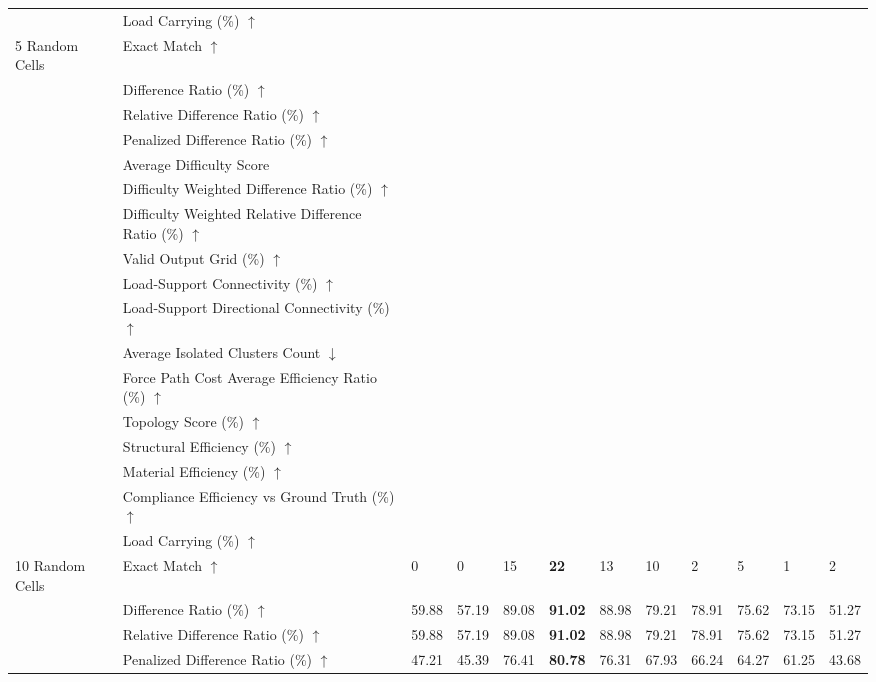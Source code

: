 \begin{table}[!h]
{\begin{tabular}{llllllllllll}
 & Load Carrying (\%) $\uparrow$ &  &  &  &  &  &  &  &  &  &  \\
5 Random Cells & Exact Match $\uparrow$ &  &  &  &  &  &  &  &  &  &  \\
 & Difference Ratio (\%) $\uparrow$ &  &  &  &  &  &  &  &  &  &  \\
 & Relative Difference Ratio (\%) $\uparrow$ &  &  &  &  &  &  &  &  &  &  \\
 & Penalized Difference Ratio (\%) $\uparrow$ &  &  &  &  &  &  &  &  &  &  \\
 & Average Difficulty Score &  &  &  &  &  &  &  &  &  &  \\
 & Difficulty Weighted Difference Ratio (\%) $\uparrow$ &  &  &  &  &  &  &  &  &  &  \\
 & Difficulty Weighted Relative Difference Ratio (\%) $\uparrow$ &  &  &  &  &  &  &  &  &  &  \\
 & Valid Output Grid (\%) $\uparrow$ &  &  &  &  &  &  &  &  &  &  \\
 & Load-Support Connectivity (\%) $\uparrow$ &  &  &  &  &  &  &  &  &  &  \\
 & Load-Support Directional Connectivity (\%) $\uparrow$ &  &  &  &  &  &  &  &  &  &  \\
 & Average Isolated Clusters Count $\downarrow$ &  &  &  &  &  &  &  &  &  &  \\
 & Force Path Cost Average Efficiency Ratio (\%) $\uparrow$ &  &  &  &  &  &  &  &  &  &  \\
 & Topology Score (\%) $\uparrow$ &  &  &  &  &  &  &  &  &  &  \\
 & Structural Efficiency (\%) $\uparrow$ &  &  &  &  &  &  &  &  &  &  \\
 & Material Efficiency (\%) $\uparrow$ &  &  &  &  &  &  &  &  &  &  \\
 & Compliance Efficiency vs Ground Truth (\%) $\uparrow$ &  &  &  &  &  &  &  &  &  &  \\
 & Load Carrying (\%) $\uparrow$ &  &  &  &  &  &  &  &  &  &  \\
10 Random Cells & Exact Match $\uparrow$ & 0 & 0 & 15 & \textbf{22} & 13 & 10 & 2 & 5 & 1 & 2 \\
 & Difference Ratio (\%) $\uparrow$ & 59.88 & 57.19 & 89.08 & \textbf{91.02} & 88.98 & 79.21 & 78.91 & 75.62 & 73.15 & 51.27 \\
 & Relative Difference Ratio (\%) $\uparrow$ & 59.88 & 57.19 & 89.08 & \textbf{91.02} & 88.98 & 79.21 & 78.91 & 75.62 & 73.15 & 51.27 \\
 & Penalized Difference Ratio (\%) $\uparrow$ & 47.21 & 45.39 & 76.41 & \textbf{80.78} & 76.31 & 67.93 & 66.24 & 64.27 & 61.25 & 43.68 \\

\end{tabular}}
\end{table}
